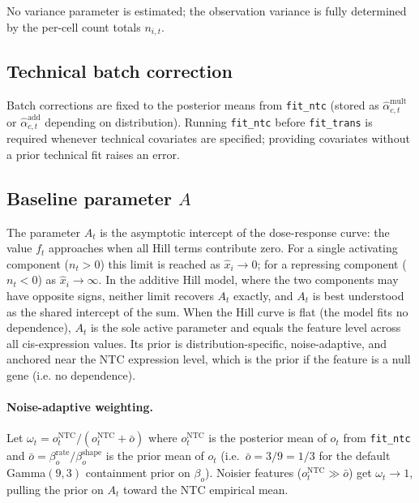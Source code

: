 \documentclass[12pt]{article}
\begin{document}
No variance parameter is estimated; the observation variance is fully determined by
the per-cell count totals $n_{i,t}$.

\subsection{Technical batch correction}

Batch corrections are fixed to the posterior means from \texttt{fit\_ntc} (stored as
$\hat\alpha_{c,t}^{\text{mult}}$ or $\hat\alpha_{c,t}^{\text{add}}$ depending on
distribution).
Running \texttt{fit\_ntc} before \texttt{fit\_trans} is required whenever technical covariates
are specified; providing covariates without a prior technical fit raises an error.

\subsection{Baseline parameter \texorpdfstring{$A$}{A}}
\label{sec:trans_A}

The parameter $A_t$ is the asymptotic intercept of the dose-response curve: the value
$f_t$ approaches when all Hill terms contribute zero.
For a single activating component ($n_{t} > 0$) this limit is reached as
$\hat x_i \to 0$; for a repressing component ($n_{t} < 0$) as $\hat x_i \to \infty$.
In the additive Hill model, where the two components may have opposite signs, neither
limit recovers $A_t$ exactly, and $A_t$ is best understood as the shared intercept
of the sum.
When the Hill curve is flat (the model fits no dependence), $A_t$ is the sole active parameter
and equals the feature level across all cis-expression values.
Its prior is distribution-specific, noise-adaptive, and anchored near the NTC expression
level, which is the prior if the feature is a null gene (i.e. no dependence).

\paragraph{Noise-adaptive weighting.}

Let $\omega_t = o_t^{\mathrm{NTC}} / (o_t^{\mathrm{NTC}} + \bar o)$ where
$o_t^{\mathrm{NTC}}$ is the posterior mean of $o_t$ from \texttt{fit\_ntc} and
$\bar o = \beta_o^{\mathrm{rate}} / \beta_o^{\mathrm{shape}}$ is the prior mean of $o_t$
(i.e.\ $\bar o = 3/9 = 1/3$ for the default Gamma$(9,3)$ containment prior on $\beta_o$).
Noisier features ($o_t^{\mathrm{NTC}} \gg \bar o$) get $\omega_t \to 1$, pulling the
prior on $A_t$ toward the NTC empirical mean.
\end{document}
